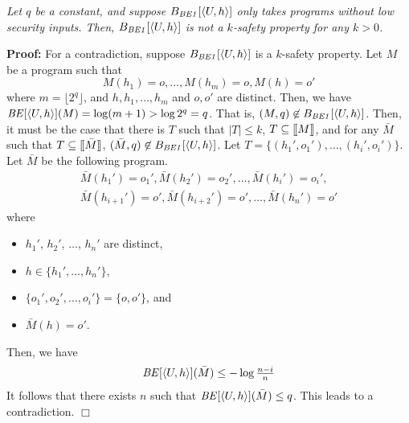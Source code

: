 \documentclass{llncs}
\newenvironment{proof}{\noindent\rm{\bf Proof:}}{\hbox{$\Box$}\vspace*{0.2\baselineskip}}
\newenvironment{reftheorem}[1]{\begin{trivlist}\item[\hskip
      \labelsep{\bf Theorem #1.}]\it}{\end{trivlist}}
\newcommand{\aset}[1]{\{{#1}\}}
\newcommand{\aseq}[1]{\langle#1\rangle}
\newcommand{\sembrack}[1]{[\hspace*{-1.2pt}[#1]\hspace*{-1.2pt}]}
\begin{document}
\begin{reftheorem}{\ref{thm:be1nk}}
Let $q$ be a constant, and suppose $B_{\it BE1}[\aseq{U,h}]$ only
takes programs without low security inputs.  Then, $B_{\it
  BE1}[\aseq{U,h}]$ is not a $k$-safety property for any $k > 0$.
\end{reftheorem}
\begin{proof}
For a contradiction, suppose $B_{\it BE1}[\aseq{U,h}]$ is
a $k$-safety property.  Let $M$ be a program such that 
\[
M(h_1)=o,\dots, M(h_m)=o,M(h)=o'
\]
where $m=\lfloor 2^q\rfloor$, and $h,h_1,\dots,h_m$ and $o,o'$ are
distinct.  Then, we have ${\it BE}[\aseq{U,h}](M)=\log(m+1)>\log
2^q=q$.  That is, $(M,q)\not\in B_{\it BE1}[\aseq{U,h}]$.  Then, it
must be the case that there is $T$ such that $|T|\le k$,
$T\subseteq\sembrack{M}$, and for any $\bar{M}$ such that $T\subseteq
\sembrack{\bar{M}}$, $(\bar{M},q)\not\in B_{\it BE1}[\aseq{U,h}]$.
Let $T=\aset{(h_1',o_1'),\dots,(h_i',o_i')}$.  Let $\bar{M}$ be the
following program.
\[
\begin{array}{l}
  \bar{M}(h_1')=o_1',
  \bar{M}(h_2')=o_2', 
  \dots, 
  \bar{M}(h_i')=o_i',\\
  \bar{M}(h_{i+1}')=o',
  \bar{M}(h_{i+2}')=o',
\dots,
  \bar{M}(h_{n}')=o'
\end{array}
\]
where 
\begin{itemize}
\item $h_1'$, $h_2'$, $\dots$, $h_{n}'$ are distinct,
\item $h\in\aset{h_1', \dots, h_n'}$,
\item $\aset{o_1', o_2', \dots, o_i'}=\aset{o,o'}$, and
\item $\bar{M}(h) = o'$.
\end{itemize}
Then, we have 
\[
\begin{array}{rcl}
{\it BE}[\aseq{U,h}](\bar{M})\leq-\log\frac{n-i}{n}
\end{array}
\]
It follows that there exists $n$ such that ${\it
BE}[\aseq{U,h}](\bar{M})\le q$.  This leads to a contradiction.
\end{proof}
\end{document}
